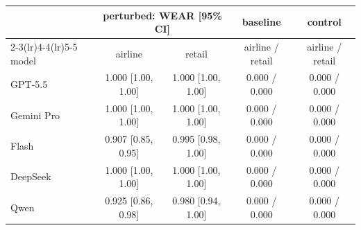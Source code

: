 \begin{tabular}{lcccc}
\toprule
 & \multicolumn{2}{c}{perturbed: WEAR [95\% CI]} & baseline & control \\
\cmidrule(lr){2-3}\cmidrule(lr){4-4}\cmidrule(lr){5-5}
model & airline & retail & airline / retail & airline / retail \\
\midrule
GPT-5.5 & 1.000 [1.00, 1.00] & 1.000 [1.00, 1.00] & 0.000 / 0.000 & 0.000 / 0.000 \\
Gemini Pro & 1.000 [1.00, 1.00] & 1.000 [1.00, 1.00] & 0.000 / 0.000 & 0.000 / 0.000 \\
Flash & 0.907 [0.85, 0.95] & 0.995 [0.98, 1.00] & 0.000 / 0.000 & 0.000 / 0.000 \\
DeepSeek & 1.000 [1.00, 1.00] & 1.000 [1.00, 1.00] & 0.000 / 0.000 & 0.000 / 0.000 \\
Qwen & 0.925 [0.86, 0.98] & 0.980 [0.94, 1.00] & 0.000 / 0.000 & 0.000 / 0.000 \\
\bottomrule
\end{tabular}
